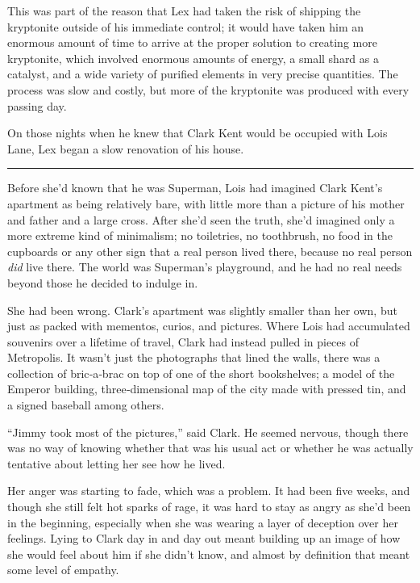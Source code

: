 This was part of the reason that Lex had taken the risk of shipping the
kryptonite outside of his immediate control; it would have taken him an
enormous amount of time to arrive at the proper solution to creating
more kryptonite, which involved enormous amounts of energy, a small
shard as a catalyst, and a wide variety of purified elements in very
precise quantities. The process was slow and costly, but more of the
kryptonite was produced with every passing day.

On those nights when he knew that Clark Kent would be occupied with Lois
Lane, Lex began a slow renovation of his house.

\begin{center}\rule{0.5\linewidth}{\linethickness}\end{center}

Before she'd known that he was Superman, Lois had imagined Clark Kent's
apartment as being relatively bare, with little more than a picture of
his mother and father and a large cross. After she'd seen the truth,
she'd imagined only a more extreme kind of minimalism; no toiletries, no
toothbrush, no food in the cupboards or any other sign that a real
person lived there, because no real person \emph{did} live there. The
world was Superman's playground, and he had no real needs beyond those
he decided to indulge in.

She had been wrong. Clark's apartment was slightly smaller than her own,
but just as packed with mementos, curios, and pictures. Where Lois had
accumulated souvenirs over a lifetime of travel, Clark had instead
pulled in pieces of Metropolis. It wasn't just the photographs that
lined the walls, there was a collection of bric‐a‐brac on top of one of
the short bookshelves; a model of the Emperor building,
three‐dimensional map of the city made with pressed tin, and a signed
baseball among others.

``Jimmy took most of the pictures,'' said Clark. He seemed nervous,
though there was no way of knowing whether that was his usual act or
whether he was actually tentative about letting her see how he lived.

Her anger was starting to fade, which was a problem. It had been five
weeks, and though she still felt hot sparks of rage, it was hard to stay
as angry as she'd been in the beginning, especially when she was wearing
a layer of deception over her feelings. Lying to Clark day in and day
out meant building up an image of how she would feel about him if she
didn't know, and almost by definition that meant some level of empathy.

